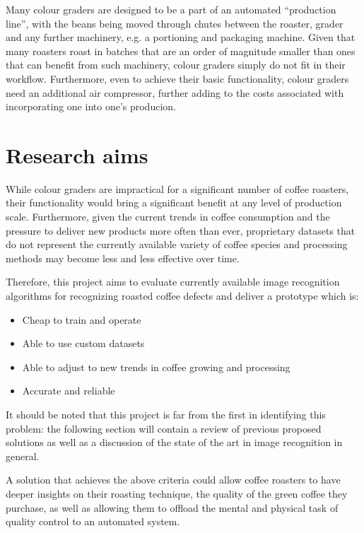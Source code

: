 \begin{itemize}
\begin{itemize}
        Many colour graders are designed to be a part of an automated ``production line'', with the beans being moved through
        chutes between the roaster, grader and any further machinery, e.g. a portioning and packaging machine.
        Given that many roasters roast in batches that are an order of magnitude smaller than ones that can benefit from such machinery,
        colour graders simply do not fit in their workflow.
        Furthermore, even to achieve their basic functionality, colour graders need an additional air compressor,
        further adding to the costs associated with incorporating one into one's producion.
    \end{itemize}
\end{itemize}


\section{Research aims}\label{sec:research-aims}
While colour graders are impractical for a significant number of coffee roasters,
their functionality would bring a significant benefit at any level of production scale.
Furthermore, given the current trends in coffee consumption and the pressure to deliver new products more often than ever,
proprietary datasets that do not represent the currently available variety of coffee species and processing methods
may become less and less effective over time.

Therefore, this project aims to evaluate currently available image recognition algorithms for recognizing roasted coffee defects
and deliver a prototype which is:
\begin{itemize}
    \item Cheap to train and operate
    \item Able to use custom datasets
    \item Able to adjust to new trends in coffee growing and processing
    \item Accurate and reliable
\end{itemize}

It should be noted that this project is far from the first in identifying this problem: the following section will
contain a review of previous proposed solutions as well as a discussion of the state of the art in image recognition
in general.

A solution that achieves the above criteria could allow coffee roasters to have deeper insights on their roasting technique,
the quality of the green coffee they purchase, as well as allowing them to offload the mental and physical task of quality control
to an automated system.
